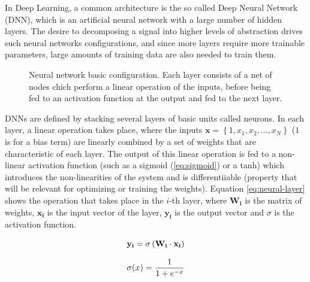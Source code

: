 In Deep Learning, a common architecture is the so called Deep Neural Network (DNN), which is an artificial neural network with a large number of hidden layers. The desire to decomposing a signal into higher levels of abstraction drives such neural networks configurations, and since more layers require more trainable parameters, large amounts of training data are also needed to train them.

\begin{figure}[h]
    \centering
    

    \caption{Neural network basic configuration. Each layer consists of a net of nodes chich perform a linear operation of the inputs, before being fed to an activation function at the output and fed to the next layer.}
    \label{fig:neural-net}
\end{figure}

DNNs are defined by stacking several layers of basic units called neurons. In each layer, a linear operation takes place, where the inputs $\mathbf{x}= \left \{ 1, x_1, x_2, ..., x_N \right \}$ ($1$ is for a bias term) are linearly combined by a set of weights that are characteristic of each layer. The output of this linear operation is fed to a non-linear activation function (such as a sigmoid (\ref{eq:sigmoid}) or a tanh) which introduces the non-linearities of the system and is differentiiable (property that will be relevant for optimizing or training the weights). Equation \ref{eq:neural-layer} shows the operation that takes place in the $i$-th layer, where $\mathbf{W_i}$  is the matrix of weights, $\mathbf{x_i}$ is the input vector of the layer, $\mathbf{y_i}$ is the output vector and $\sigma$ is the activation function.

\begin{equation}
    \centering
    \mathbf{y_i} = \sigma \left ( \mathbf{W_i} \cdot \mathbf{x_i} \right )
    \label{eq:neural-layer}
\end{equation}

\begin{equation}
    \centering
    \sigma (x) = \frac{1}{1 + e^{-x}} 
    \label{eq:sigmoid}
\end{equation}

